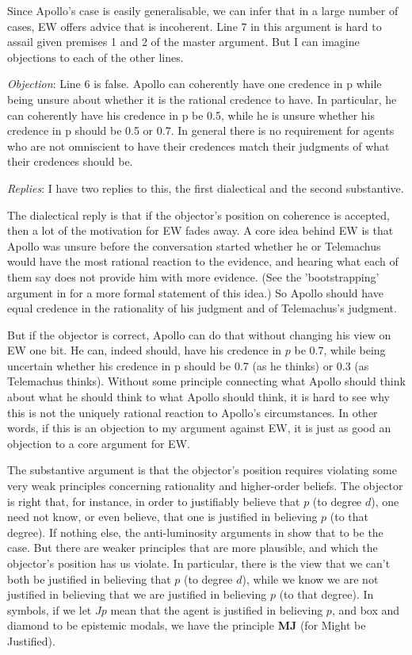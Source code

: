\noindent Since Apollo's case is easily generalisable, we can infer that in a large number of cases, EW offers advice that is incoherent. Line 7 in this argument is hard to assail given premises 1 and 2 of the master argument. But I can imagine objections to each of the other lines.

\medskip \noindent \textit{Objection}: Line 6 is false. Apollo can coherently have one credence in p while being unsure about whether it is the rational credence to have. In particular, he can coherently have his credence in p be 0.5, while he is unsure whether his credence in p should be 0.5 or 0.7. In general there is no requirement for agents who are not omniscient to have their credences match their judgments of what their credences should be.

\smallskip \noindent \textit{Replies}: I have two replies to this, the first dialectical and the second substantive.

The dialectical reply is that if the objector's position on coherence is accepted, then a lot of the motivation for EW fades away. A core idea behind EW is that Apollo was unsure before the conversation started whether he or Telemachus would have the most rational reaction to the evidence, and hearing what each of them say does not provide him with more evidence. (See the 'bootstrapping' argument in \citet{Elga2007-ELGRAD} for a more formal statement of this idea.) So Apollo should have equal credence in the rationality of his judgment and of Telemachus's judgment.

But if the objector is correct, Apollo can do that without changing his view on EW one bit. He can, indeed should, have his credence in $p$ be 0.7, while being uncertain whether his credence in p should be 0.7 (as he thinks) or 0.3 (as Telemachus thinks). Without some principle connecting what Apollo should think about what he should think to what Apollo should think, it is hard to see why this is not the uniquely rational reaction to Apollo's circumstances. In other words, if this is an objection to my argument against EW, it is just as good an objection to a core argument for EW.

The substantive argument is that the objector's position requires violating some very weak principles concerning rationality and higher-order beliefs. The objector is right that, for instance, in order to justifiably believe that $p$ (to degree $d$), one need not know, or even believe, that one is justified in believing $p$ (to that degree). If nothing else, the anti-luminosity arguments in \citet{Williamson2000-WILKAI} show that to be the case. But there are weaker principles that are more plausible, and which the objector's position has us violate. In particular, there is the view that we can't both be justified in believing that $p$ (to degree $d$), while we know we are not justified in believing that we are justified in believing $p$ (to that degree). In symbols, if we let $Jp$ mean that the agent is justified in believing $p$, and box and diamond to be epistemic modals, we have the principle \textbf{MJ} (for Might be Justified).

